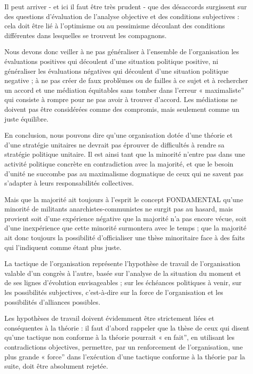 Il peut arriver - et ici il faut être très prudent - que des désaccords surgissent sur des questions d'évaluation de l'analyse objective et des conditions subjectives : cela doit être lié à l’optimisme ou au pessimisme découlant des conditions différentes dans lesquelles se trouvent les compagnons.

Nous devons donc veiller à ne pas généraliser à l'ensemble de l'organisation les évaluations positives qui découlent d'une situation politique positive, ni généraliser les évaluations négatives qui découlent d'une situation politique negative ; à ne pas créer de faux problèmes ou de failles à ce sujet et à rechercher un accord et une médiation équitables sans tomber dans l'erreur « maximaliste'' qui consiste à rompre pour ne pas avoir à trouver d’accord. Les médiations ne doivent pas être considérées comme des compromis, mais seulement comme un juste équilibre.

En conclusion, nous pouvons dire qu'une organisation dotée d'une théorie et d'une stratégie unitaires ne devrait pas éprouver de difficultés à rendre sa stratégie politique unitaire. Il est ainsi tant que la minorité n'entre pas dans une activité politique concrète en contradiction avec la majorité, et que le besoin d'unité ne succombe pas au maximalisme dogmatique de ceux qui ne savent pas s'adapter à leurs responsabilités collectives.

Mais que la majorité ait toujours à l'esprit le concept FONDAMENTAL qu'une minorité de militants anarchistes-communistes ne surgit pas au hasard, mais provient soit d'une expérience négative que la majorité n'a pas encore vécue, soit d'une inexpérience que cette minorité surmontera avec le temps ; que la majorité ait donc toujours la possibilité d'officialiser une thèse minoritaire face à des faits qui l'indiquent comme étant plus juste.

La tactique de l'organisation représente l'hypothèse de travail de l'organisation valable d'un congrès à l'autre, basée sur l'analyse de la situation du moment et de ses lignes d'évolution envisageables ; sur les échéances politiques à venir, sur les possibilités subjectives, c'est-à-dire sur la force de l'organisation et les possibilités d'alliances possibles.

Les hypothèses de travail doivent évidemment être strictement liées et conséquentes à la théorie : il faut d'abord rappeler que la thèse de ceux qui disent qu'une tactique non conforme à la théorie pourrait « en fait'', en utilisant les contradictions objectives, permettre, par un renforcement de l'organisation, une plus grande « force'' dans l'exécution d'une tactique conforme à la théorie par la suite, doit être absolument rejetée.

